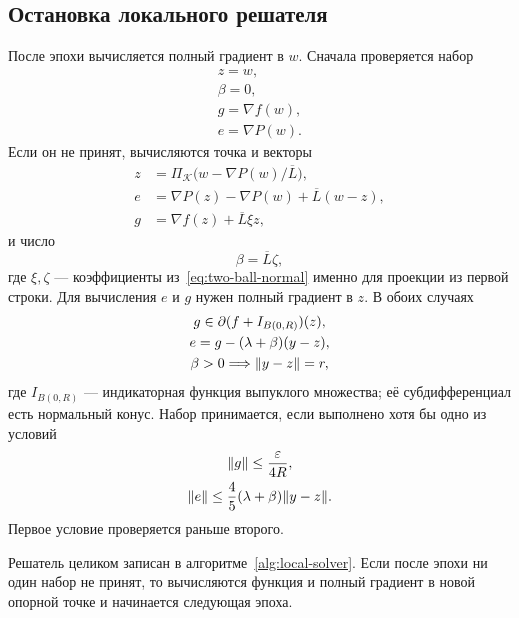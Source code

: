 \subsection{Остановка локального решателя}
После эпохи вычисляется полный градиент в $w$. Сначала проверяется
набор
\[
 \begin{gathered}
 z=w,\\
 \beta=0,\\
 g=\nabla f(w),\\
 e=\nabla P(w).
 \end{gathered}
\]
Если он не принят, вычисляются точка и векторы
\begin{equation}\label{eq:certificate-projection}
 \begin{aligned}
 z&=\Pi_{\mathcal K}\bigl(w-\nabla P(w)/\overline L\bigr),\\
 e&=\nabla P(z)-\nabla P(w)+\overline L(w-z),\\
 g&=\nabla f(z)+\overline L\xi z,
 \end{aligned}
\end{equation}
и число
\[
 \beta=\overline L\zeta,
\]
где $\xi,\zeta$ --- коэффициенты из~\eqref{eq:two-ball-normal} именно для
проекции из первой строки. Для вычисления $e$ и $g$ нужен полный градиент
в $z$. В обоих случаях
\begin{equation}\label{eq:certificate-properties}
 \begin{gathered}
 g\in\partial(f+I_{B(0,R)})(z),\\
 e=g-(\lambda+\beta)(y-z),\\
 \beta>0\Longrightarrow\lVert y-z\rVert=r,
 \end{gathered}
\end{equation}
где $I_{B(0,R)}$ --- индикаторная функция выпуклого множества; её
субдифференциал есть нормальный конус. Набор принимается, если
выполнено хотя бы одно из условий
\begin{equation}\label{eq:certificate-test}
 \begin{gathered}
 \lVert g\rVert\le\frac\varepsilon{4R},\\
 \lVert e\rVert\le\frac45(\lambda+\beta)\lVert y-z\rVert.
 \end{gathered}
\end{equation}
Первое условие проверяется раньше второго.

Решатель целиком записан в алгоритме~\ref{alg:local-solver}.
Если после эпохи ни один набор не принят, то вычисляются функция и полный градиент
в новой опорной точке и начинается следующая эпоха.

